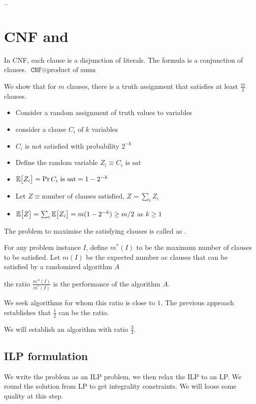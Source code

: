 ..

\section{CNF and \maxsat}

In CNF, each clause is a disjunction of literals. The formula is a conjunction
of clauses. $\texttt{CNF} \equiv \text{product of sums}$


We show that for $m$ clauses, there is a truth assignment that satisfies
at least $\frac{m}{2}$ clauses.

\begin{itemize}
    \item Consider a random assignment of truth values to variables
    \item consider a clause $C_i$ of $k$ variables
    \item $C_i$ is not satisfied with probability $2^{-k}$
    \item Define the random variable $Z_i \equiv \text{$C_i$ is sat}$
    \item $\mathbb{E}\big[ Z_i \big] = \Pr{\text{$C_i$ is sat}} = 1 - 2^{-k}$
    \item Let $Z \equiv \text{number of clauses satisfied}$, $Z = \sum_i Z_i$
    \item $\mathbb{E}\big[ Z \big] = \sum_i \mathbb{E}\big[ Z_i \big] = m(1 - 2^{-k}) \geq m/2$ as $k \geq 1$
\end{itemize}

The problem to maximise the satisfying clauses is called as \maxsat.

For any problem instance $I$, define $m^*(I)$ to be the maximum number
of clauses to be satisfied. Let $m(I)$ be the expected number oc clauses that
can be satisfied by a randomized algorithm $A$

the ratio $\frac{m^A(I)}{m^*(I)}$ is the performance of the algorithm $A$.

We seek algorithms for whom this ratio is close to $1$. The previous approach
establishes that $\frac{1}{2}$ can be the ratio.

We will establish an algorithm with ratio $\frac{3}{4}$.

\subsection{ILP formulation}

We write the problem as an ILP problem, we then relax the ILP to an LP. We
round the solution from LP to get integrality constraints. We will loose some
quality at this step.

